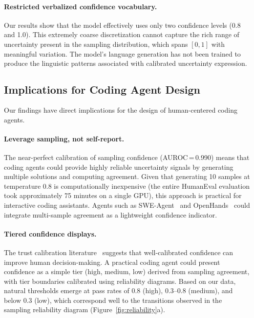 \documentclass{article}
\begin{document}
\paragraph{Restricted verbalized confidence vocabulary.}
Our results show that the model effectively uses only two confidence levels (0.8 and 1.0). This extremely coarse discretization cannot capture the rich range of uncertainty present in the sampling distribution, which spans $[0, 1]$ with meaningful variation. The model's language generation has not been trained to produce the linguistic patterns associated with calibrated uncertainty expression.

\subsection{Implications for Coding Agent Design}

Our findings have direct implications for the design of human-centered coding agents.

\paragraph{Leverage sampling, not self-report.}
The near-perfect calibration of sampling confidence (AUROC\,=\,0.990) means that coding agents could provide highly reliable uncertainty signals by generating multiple solutions and computing agreement. Given that generating 10 samples at temperature 0.8 is computationally inexpensive (the entire HumanEval evaluation took approximately 75 minutes on a single GPU), this approach is practical for interactive coding assistants. Agents such as SWE-Agent~\citep{yang2024swe} and OpenHands~\citep{wang2024opendevin} could integrate multi-sample agreement as a lightweight confidence indicator.

\paragraph{Tiered confidence displays.}
The trust calibration literature~\citep{zhang2020effect, yin2019understanding} suggests that well-calibrated confidence can improve human decision-making. A practical coding agent could present confidence as a simple tier (high, medium, low) derived from sampling agreement, with tier boundaries calibrated using reliability diagrams. Based on our data, natural thresholds emerge at pass rates of 0.8 (high), 0.3--0.8 (medium), and below 0.3 (low), which correspond well to the transitions observed in the sampling reliability diagram (Figure~\ref{fig:reliability}a).
\end{document}
